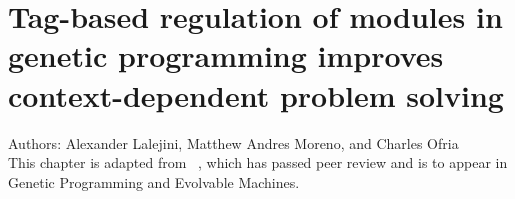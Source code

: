 \chapter{ Tag-based regulation of modules in genetic programming improves context-dependent problem solving }
\label{chapter:tag-based-regulation}



\noindent
Authors: Alexander Lalejini, Matthew Andres Moreno, and Charles Ofria \\
This chapter is adapted from ~\citep{lalejini2020tagbased}, which has passed peer review and is to appear in Genetic Programming and Evolvable Machines.







